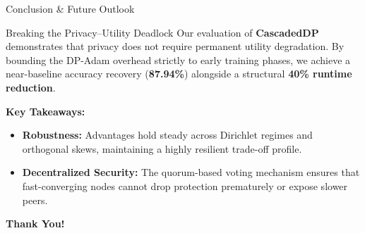 \documentclass[aspectratio=169]{beamer}
\begin{document}
\begin{frame}{Conclusion \& Future Outlook}
\begin{block}{Breaking the Privacy--Utility Deadlock}
    Our evaluation of \textbf{CascadedDP} demonstrates that privacy does not require permanent utility degradation. By bounding the DP-Adam overhead strictly to early training phases, we achieve a near-baseline accuracy recovery (\textbf{87.94\%}) alongside a structural \textbf{40\% runtime reduction}.
\end{block}

\vspace{0.1cm}
\textbf{Key Takeaways:}
\begin{itemize}
    \item \textbf{Robustness:} Advantages hold steady across Dirichlet regimes and orthogonal skews, maintaining a highly resilient trade-off profile.
    \item \textbf{Decentralized Security:} The quorum-based voting mechanism ensures that fast-converging nodes cannot drop protection prematurely or expose slower peers.
\end{itemize}
\end{frame}
\begin{frame}[c]{}
\centering
\Huge{\textbf{Thank You!}}
\end{frame}
\end{document}
